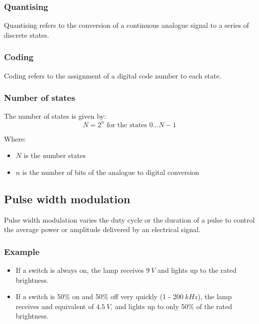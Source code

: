 \documentclass[11pt]{article}
\begin{document}
\subsubsection{Quantising}
\label{sec:orgecf95b4}
Quantising refers to the conversion of a continuous analogue signal to a series of discrete states.
\subsubsection{Coding}
\label{sec:org305d5a4}
Coding refers to the assignment of a digital code number to each state.
\subsubsection{Number of states}
\label{sec:org4da2b48}
The number of states is given by:
\[N = 2^n \text{ for the states } 0 \ldots N - 1\]

Where:
\begin{itemize}
\item \(N\) is the number states
\item \(n\) is the number of bits of the analogue to digital conversion
\end{itemize}
\subsection{Pulse width modulation}
\label{sec:orgcd7805a}
Pulse width modulation varies the duty cycle or the duration of a pulse to control the average power or amplitude delivered by an electrical signal.
\subsubsection{Example}
\label{sec:orga863e5c}
\begin{itemize}
\item If a switch is always on, the lamp receives \(\qty{9}{V}\) and lights up to the rated brightness.
\item If a switch is 50\% on and 50\% off very quickly (1 - \(\qty{200}{kHz}\)), the lamp receives and equivalent of \(\qty{4.5}{V}\), and lights up to only 50\% of the rated brightness.
\end{itemize}
\end{document}
